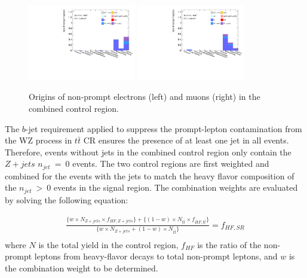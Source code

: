 \begin{figure}[htb]
        \centering
        \includegraphics[width = 0.42\textwidth]{figures/Analysis/Background/NonPromptComposition_Combined_Electrons.pdf}
        \includegraphics[width = 0.42\textwidth]{figures/Analysis/Background/NonPromptComposition_Combined_Muons.pdf}
        \caption{ Origins of non-prompt electrons (left) and muons (right) in the combined control region. \label{fig:NonPromptCombined}}
\end{figure}

The $b$-jet requirement applied to suppress the prompt-lepton contamination from the WZ process in $t\bar{t}$ CR ensures the presence of at least one jet in all events. Therefore, events without jets in the combined control region only contain the $Z+jets$ $n_{jet}~=~0$ events. The two control regions are first weighted and combined for the events with the jets to match the heavy flavor composition of the $n_{jet}~>~0$ events in the signal region. The combination weights are evaluated by solving the following equation$:$

\begin{equation}
\begin{aligned}
\frac{\{w \times N_{Z+jets} \times f_{HF, Z+jets}\} + \{ (1-w) \times N_{t\bar{t}} \times f_{HF, t\bar{t}}\}}{\{w \times N_{Z+jets} + (1-w) \times N_{t\bar{t}} \}} = f_{HF, SR}  \\
\end{aligned}
\end{equation}
where $N$ is the total yield in the control region, $ f_{HF}$ is the ratio of the non-prompt leptons from heavy-flavor decays to total non-prompt leptons, and $w$ is the combination weight to be determined.

